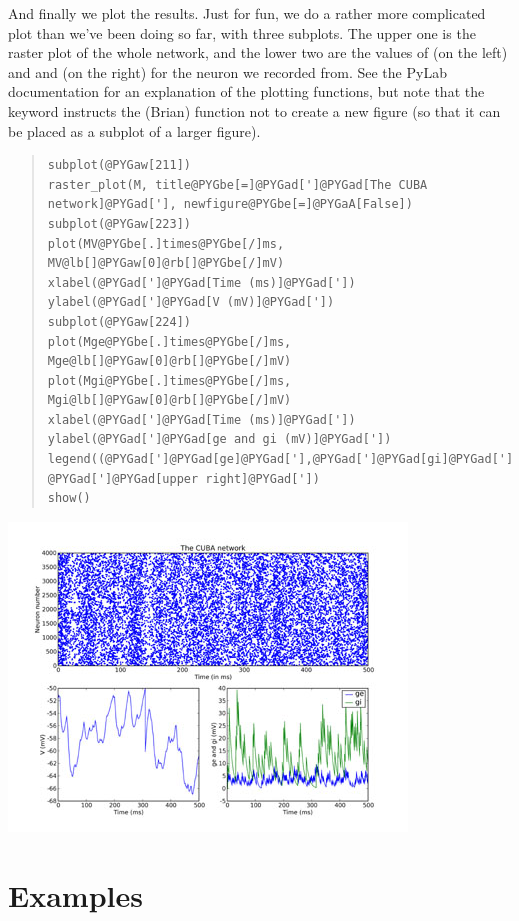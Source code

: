\documentclass[letterpaper,10pt]{manual}
\begin{document}
And finally we plot the results. Just for fun, we do a rather more
complicated plot than we've been doing so far, with three subplots.
The upper one is the raster plot of the whole network, and the
lower two are the values of  (on the left) and  and  (on the
right) for the neuron we recorded from. See the PyLab documentation
for an explanation of the plotting functions, but note that the
\hyperlink{brian.raster_plot}{} keyword  instructs the (Brian) function
\hyperlink{brian.raster_plot}{} not to create a new figure (so that it can be placed
as a subplot of a larger figure).
\begin{quote}

\begin{Verbatim}[commandchars=@\[\]]
subplot(@PYGaw[211])
raster_plot(M, title@PYGbe[=]@PYGad[']@PYGad[The CUBA network]@PYGad['], newfigure@PYGbe[=]@PYGaA[False])
subplot(@PYGaw[223])
plot(MV@PYGbe[.]times@PYGbe[/]ms, MV@lb[]@PYGaw[0]@rb[]@PYGbe[/]mV)
xlabel(@PYGad[']@PYGad[Time (ms)]@PYGad['])
ylabel(@PYGad[']@PYGad[V (mV)]@PYGad['])
subplot(@PYGaw[224])
plot(Mge@PYGbe[.]times@PYGbe[/]ms, Mge@lb[]@PYGaw[0]@rb[]@PYGbe[/]mV)
plot(Mgi@PYGbe[.]times@PYGbe[/]ms, Mgi@lb[]@PYGaw[0]@rb[]@PYGbe[/]mV)
xlabel(@PYGad[']@PYGad[Time (ms)]@PYGad['])
ylabel(@PYGad[']@PYGad[ge and gi (mV)]@PYGad['])
legend((@PYGad[']@PYGad[ge]@PYGad['],@PYGad[']@PYGad[gi]@PYGad[']), @PYGad[']@PYGad[upper right]@PYGad['])
show()
\end{Verbatim}
\end{quote}

\includegraphics{2c.jpg}

\resetcurrentobjects


\section{Examples}
\end{document}
